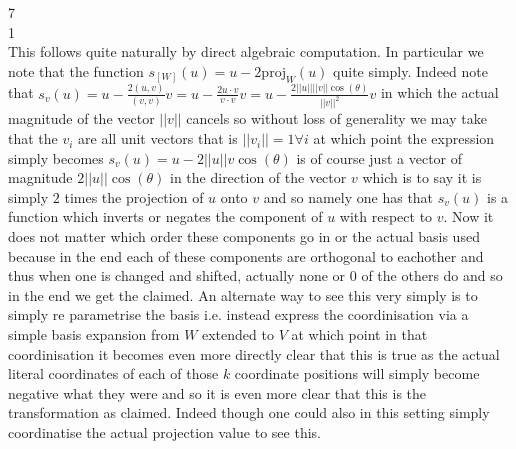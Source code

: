 7 \\
1 \\
This follows quite naturally by direct algebraic computation. In particular we note that the function $s_{[W]}(u) = u - 2 \text{proj}_W (u)$ quite simply. Indeed note that $s_v (u) = u - \frac{2(u,v)}{(v,v)}v = u - \frac{2 u \cdot v}{v \cdot v}v = u - \frac{2 ||u|| ||v|| \cos (\theta)}{||v||^2}v$ in which the actual magnitude of the vector $||v||$ cancels so without loss of generality we may take that the $v_i$ are all unit vectors that is $||v_i|| = 1 \forall i$ at which point the expression simply becomes $s_v (u) = u - 2 ||u||v \cos(\theta)$ is of course just a vector of magnitude $2||u|| \cos(\theta)$ in the direction of the vector $v$ which is to say it is simply $2$ times the projection of $u$ onto $v$ and so namely one has that $s_v (u)$ is a function which inverts or negates the component of $u$ with respect to $v$. Now it does not matter which order these components go in or the actual basis used because in the end each of these components are orthogonal to eachother and thus when one is changed and shifted, actually none or $0$ of the others do and so in the end we get the claimed. An alternate way to see this very simply is to simply re parametrise the basis i.e. instead express the coordinisation via a simple basis expansion from $W$ extended to $V$ at which point in that coordinisation it becomes even more directly clear that this is true as the actual literal coordinates of each of those $k$ coordinate positions will simply become negative what they were and so it is even more clear that this is the transformation as claimed. Indeed though one could also in this setting simply coordinatise the actual projection value to see this.



